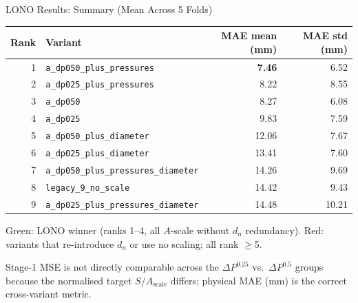 \documentclass[UTF8,aspectratio=169]{ctexbeamer}
\newcommand{\good}[1]{\textcolor{green!45!black}{#1}}
\newcommand{\warn}[1]{\textcolor{red!65!black}{#1}}
\begin{document}
\begin{frame}{LONO Results: Summary (Mean Across 5 Folds)}
\small
\begin{center}
\renewcommand{\arraystretch}{1.22}
\begin{tabular}{@{}rlrr@{}}
\toprule
\textbf{Rank} & \textbf{Variant} & \textbf{MAE mean (mm)} & \textbf{MAE std (mm)} \\
\midrule
\rowcolor{winrow}
1 & \texttt{a\_dp050\_plus\_pressures} & \textbf{7.46} & 6.52 \\
2 & \texttt{a\_dp025\_plus\_pressures} & 8.22 & 8.55 \\
3 & \texttt{a\_dp050} & 8.27 & 6.08 \\
4 & \texttt{a\_dp025} & 9.83 & 7.59 \\
\midrule
\rowcolor{warnrow}
5 & \texttt{a\_dp050\_plus\_diameter} & 12.06 & 7.67 \\
\rowcolor{warnrow}
6 & \texttt{a\_dp025\_plus\_diameter} & 13.41 & 7.60 \\
\rowcolor{warnrow}
7 & \texttt{a\_dp050\_plus\_pressures\_diameter} & 14.26 & 9.69 \\
\rowcolor{warnrow}
8 & \texttt{legacy\_9\_no\_scale} & 14.42 & 9.43 \\
\rowcolor{warnrow}
9 & \texttt{a\_dp025\_plus\_pressures\_diameter} & 14.48 & 10.21 \\
\bottomrule
\end{tabular}
\end{center}

\vspace{0.3em}
\small
\good{Green}: LONO winner (ranks 1--4, all $A$-scale without $d_n$ redundancy). \quad
\warn{Red}: variants that re-introduce $d_n$ or use no scaling; all rank $\geq$5.

\vspace{0.2em}
\footnotesize
Stage-1 MSE is not directly comparable across the $\Delta P^{0.25}$ vs.\ $\Delta P^{0.5}$ groups because
the normalised target $S/A_{\mathrm{scale}}$ differs; physical MAE (mm) is the correct cross-variant metric.
\end{frame}
\end{document}
